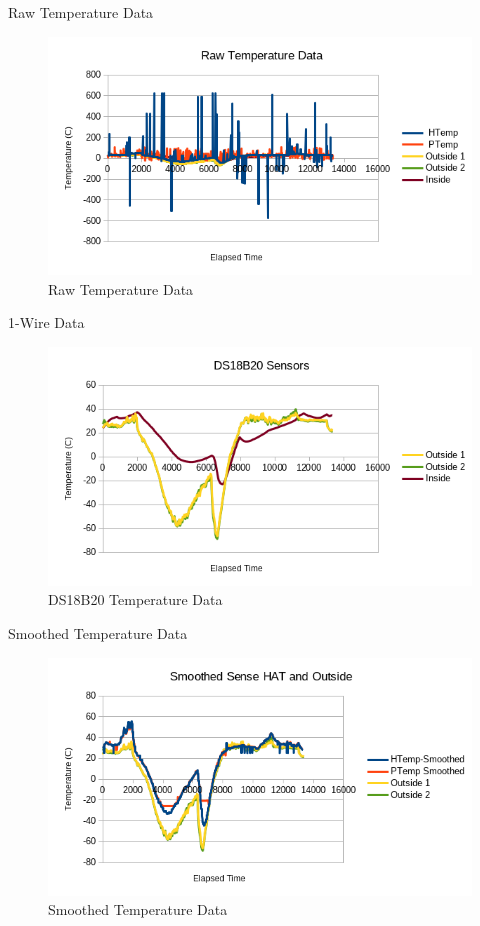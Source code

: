 \documentclass[handout]{beamer}
\begin{document}
\begin{frame}{Raw Temperature Data}
	\begin{figure}
		\centering
		\includegraphics[height=0.75\textheight]{images/rawtemp}
		\caption{Raw Temperature Data}
	\end{figure}
\end{frame}

\begin{frame}{1-Wire Data}
	\begin{figure}
		\centering
		\includegraphics[height=0.75\textheight]{images/ds18b20-data}
		\caption{DS18B20 Temperature Data}
	\end{figure}
\end{frame}

\begin{frame}{Smoothed Temperature Data}
	\begin{figure}
		\centering
		\includegraphics[height=0.75\textheight]{images/smoothtemp}
		\caption{Smoothed Temperature Data}
	\end{figure}
\end{frame}
\end{document}
